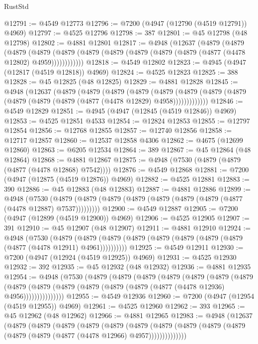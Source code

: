 \begin{lexlean}{RustStd}
\begin{coremodule}
{\begin{coremodule}
{{{{{{{{{{{{{{{{{{{{{{{{{{{{{{{{{{{{{{{{{{{{{{{{{{{{{{{{{{{{@12791 := @4549 @12773
@12796 := @7200 (@4947 (@12790 (@4519 @12791)) @4969)
@12797 := @4525 @12796
@12798 := 387
@12801 := @45 @12798 (@48 @12798)
@12802 := @4881 @12801
@12817 := @4948
    (@12637
      (@4879
        (@4879
          (@4879
            (@4879 (@4879 (@4879 (@4879 (@4879 (@4879 (@4879 (@4877 (@4478 @12802) @4959))))))))))))
@12818 := @4549 @12802
@12823 := @4945 (@4947 (@12817 (@4519 @12818)) @4969)
@12824 := @4525 @12823
@12825 := 388
@12828 := @45 @12825 (@48 @12825)
@12829 := @4881 @12828
@12845 := @4948
    (@12637
      (@4879
        (@4879
          (@4879
            (@4879
              (@4879
                (@4879 (@4879 (@4879 (@4879 (@4879 (@4879 (@4877 (@4478 @12829) @4958)))))))))))))
@12846 := @4549 @12829
@12851 := @4945 (@4947 (@12845 (@4519 @12846)) @4969)
@12853 := @4525 @12851 @4533
@12854 := @12824 @12853
@12855 := @12797 @12854
@12856 := @12768 @12855
@12857 := @12740 @12856
@12858 := @12717 @12857
@12860 := @12537 @12858 @4306
@12862 := @4675 (@12699 @12860)
@12863 := @6205 @12534
@12864 := 389
@12867 := @45 @12864 (@48 @12864)
@12868 := @4881 @12867
@12875 := @4948 (@7530 (@4879 (@4879 (@4877 (@4478 @12868) @7542))))
@12876 := @4549 @12868
@12881 := @7200 (@4947 (@12875 (@4519 @12876)) @4969)
@12882 := @4525 @12881
@12883 := 390
@12886 := @45 @12883 (@48 @12883)
@12887 := @4881 @12886
@12899 := @4948
    (@7530 (@4879 (@4879 (@4879 (@4879 (@4879 (@4879 (@4879 (@4877 (@4478 @12887) @7537)))))))))
@12900 := @4549 @12887
@12905 := @7200 (@4947 (@12899 (@4519 @12900)) @4969)
@12906 := @4525 @12905
@12907 := 391
@12910 := @45 @12907 (@48 @12907)
@12911 := @4881 @12910
@12924 := @4948
    (@7530
      (@4879 (@4879 (@4879 (@4879 (@4879 (@4879 (@4879 (@4879 (@4877 (@4478 @12911) @4961))))))))))
@12925 := @4549 @12911
@12930 := @7200 (@4947 (@12924 (@4519 @12925)) @4969)
@12931 := @4525 @12930
@12932 := 392
@12935 := @45 @12932 (@48 @12932)
@12936 := @4881 @12935
@12954 := @4948
    (@7530
      (@4879
        (@4879
          (@4879
            (@4879
              (@4879
                (@4879
                  (@4879
                    (@4879
                      (@4879 (@4879 (@4879 (@4879 (@4879 (@4877 (@4478 @12936) @4956)))))))))))))))
@12955 := @4549 @12936
@12960 := @7200 (@4947 (@12954 (@4519 @12955)) @4969)
@12961 := @4525 @12960
@12962 := 393
@12965 := @45 @12962 (@48 @12962)
@12966 := @4881 @12965
@12983 := @4948
    (@12637
      (@4879
        (@4879
          (@4879
            (@4879
              (@4879
                (@4879
                  (@4879
                    (@4879 (@4879 (@4879 (@4879 (@4879 (@4877 (@4478 @12966) @4957))))))))))))))
}}}}}}}}}}}}}}}}}}}}}}}}}}}}}}}}}}}}}}}}}}}}}}}}}}}}}}}}}}}}
\end{coremodule}}
\end{coremodule}
\end{lexlean}
